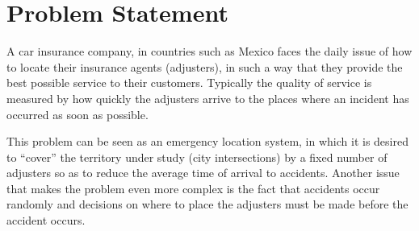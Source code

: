 \section{Problem Statement}
A car insurance company,
in countries such as Mexico
faces the daily issue
of how to locate
their insurance agents (adjusters),
in such a way
that they provide
the best possible service
to their customers.
Typically
the quality of service
is measured
by how quickly
the adjusters arrive
to the places
where an incident has occurred
as soon as possible.

This problem
can be seen
as an emergency location system, %
in which
it is desired to ``cover''
the territory under study
(city intersections)
by a fixed number of adjusters
so as to reduce
the average time
of arrival to accidents.
Another issue
that makes the problem
even more complex
is the fact
that accidents occur randomly
and decisions
on where to place the adjusters
must be made before
the accident occurs.
